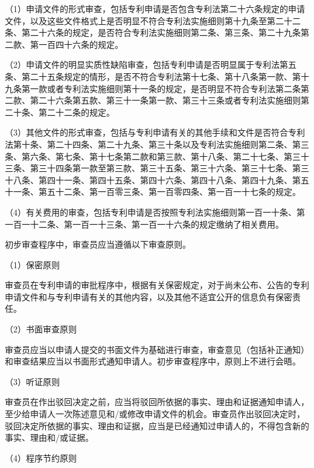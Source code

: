 
（1）申请文件的形式审查，包括专利申请是否包含专利法第二十六条规定的申请文件，以及这些文件格式上是否明显不符合专利法实施细则第十九条至第二十二条、第二十六条的规定，是否符合专利法实施细则第二条、第三条、第二十九条第二款、第一百四十六条的规定。

（2）申请文件的明显实质性缺陷审查，包括专利申请是否明显属于专利法第五条、第二十五条规定的情形，是否不符合专利法第十七条、第十八条第一款、第十九条第一款或者专利法实施细则第十一条的规定，是否明显不符合专利法第二条第二款、第二十六条第五款、第三十一条第一款、第三十三条或者专利法实施细则第二十条、第二十二条的规定。

（3）其他文件的形式审查，包括与专利申请有关的其他手续和文件是否符合专利法第十条、第二十四条、第二十九条、第三十条以及专利法实施细则第二条、第三条、第六条、第七条、第十七条第二款和第三款、第十八条、第二十七条、第三十三条、第三十四条第一款至第三款、第三十五条、第三十六条、第三十七条、第三十八条、第四十一条、第四十五条、第四十六条、第四十八条、第四十九条、第五十一条、第五十二条、第一百零三条、第一百零四条、第一百一十七条的规定。

（4）有关费用的审查，包括专利申请是否按照专利法实施细则第一百一十条、第一百一十二条、第一百一十三条、第一百一十六条的规定缴纳了相关费用。

初步审查程序中，审查员应当遵循以下审查原则。

{\setlength{\parindent}{17.1bp}（1）保密原则\par}

审查员在专利申请的审批程序中，根据有关保密规定，对于尚未公布、公告的专利申请文件和与专利申请有关的其他内容，以及其他不适宜公开的信息负有保密责任。

{\setlength{\parindent}{17.1bp}（2）书面审查原则\par}

审查员应当以申请人提交的书面文件为基础进行审查，审查意见（包括补正通知）和审查结果应当以书面形式通知申请人。初步审查程序中，原则上不进行会晤。

{\setlength{\parindent}{17.1bp}（3）听证原则\par}

审查员在作出驳回决定之前，应当将驳回所依据的事实、理由和证据通知申请人，至少给申请人一次陈述意见和/或修改申请文件的机会。审查员作出驳回决定时，驳回决定所依据的事实、理由和证据，应当是已经通知过申请人的，不得包含新的事实、理由和/或证据。

{\setlength{\parindent}{17.1bp}（4）程序节约原则\par}

